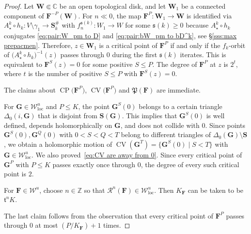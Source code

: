 \documentclass{amsart}
\newcommand{\1}{{\mathbb 1 }}
\newcommand{\bDelta}{{\mathbb{\Delta}}}
\newcommand\RR{\mathcal{R}}
\newcommand\Post{{\mathfrak P}}
\newcommand{\bF}{{\mathbf F}}
\newcommand{\bW}{{\mathbf W}}
\newcommand{\bS}{{\mathbf S}}
\newcommand{\bG}{{\mathbf G}}
\newcommand{\str}{{\star}}
\renewcommand{\tt}{\mathfrak{t}}
\renewcommand{\ss}{\mathfrak{s}}
\def\loc{{\mathrm{loc}}}
\newcommand\Unst{{\boldsymbol{\mathcal{W}}^u}}
\newcommand\UnstLoc{{\boldsymbol{\mathcal{W}}^u_\loc}}
\newcommand{\C}{\mathbb{C}}
\newcommand{\Z}{\mathbb{Z}}
\theoremstyle{remark}
\numberwithin{equation}{section}
\theoremstyle{definition}
\newcommand{\CV}{{\operatorname{CV}}}
\newcommand{\CP}{{\operatorname{CP}}}
\theoremstyle{nonumberbreak}
\begin{document}
\begin{proof}
 Let $\bW\Subset \C$ be an open topological disk, and let $\bW_1$ be a connected component of $\bF^{-P}(\bW)$. For $n\ll 0$, the map $\bF^P\colon \bW_1\to \bW$ is identified via $A_\str^k\circ h_k\colon V\setminus \gamma_1\to  \bS^{\#}_k$ with $f_n^{\ss(k)}:W_1\to W$ for some $\ss(k)\ge 0$ because  $A_\str^k\circ h_k$ conjugates \eqref{eq:pair:W_pm to D} and  \eqref{eq:pair:bW_pm to bD^k}, see \S\ref{sss:max prepacmen}. Therefore, $z\in \bW_1$ is a critical point of $\bF^P$ if and only if the $f_k$-orbit of $\big(A_\str^k\circ h_k\big)^{-1} (z)$ passes through $0$ during the first $\ss(k)$ iterates. This is equivalent to $\bF^S(z)=0$ for some positive $S\le P$. The degree of $\bF^P$ at $z$ is $2^t$, where $t$ is the number of positive $S\le P$ with  $\bF^S(z)=0$.  

 The claims about $\CP\big(\bF^P\big)$, $\CV\big(\bF^P\big)$ and $\Post(\bF)$ are immediate.


For $\bG\in \UnstLoc$ and $P\le K$, the point $\bG^S(0)$ belongs to a certain triangle $\Delta_0(i,\bG)$ that is disjoint from $\bS(\bG)$. This implies that $\bG^S(0)$ is well defined, depends holomorphically on $\bG$, and does not collide with $0$. Since points $\bG^S(0),\bG^Q(0)$ with $0<S<Q<T$ belong to different triangles of $\bDelta_0(\bG)\setminus \bS$, we obtain a holomorphic motion of $\CV(\bG^T)=\{\bG^S(0)\mid S<T\}$ with $\bG\in \UnstLoc$. We also proved~\eqref{eq:CV are away from 0}. Since every critical point of $\bG^P$ with $P\le K$ passes exactly once through $0$, the degree of every such critical point is $2$. 


For $\bF\in \Unst$, choose $n\in \Z$ so that $\RR^n(\bF)\in \UnstLoc$. Then $K_{\bF}$ can be taken to be $\tt^{n} K$.

The last claim follows from the observation that every critical point of $\bF^P$ passes through $0$ at most $(P/K_{\bF})+1$ times.
\end{proof}
\end{document}
